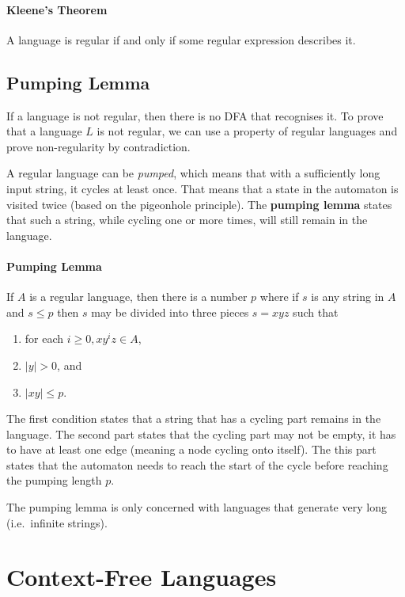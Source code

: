 \paragraph{Kleene's Theorem} A language is regular if and only if some regular expression describes it.

\subsection{Pumping Lemma}

If a language is not regular, then there is no DFA that recognises it. To prove that a language \( L \) is not regular, we can use a property of regular languages and prove non-regularity by contradiction.

A regular language can be \emph{pumped}, which means that with a sufficiently long input string, it cycles at least once. That means that a state in the automaton is visited twice (based on the pigeonhole principle). The \textbf{pumping lemma} states that such a string, while cycling one or more times, will still remain in the language.

\paragraph{Pumping Lemma} If \( A \) is a regular language, then there is a number \( p \) where if \( s \) is any string in \( A \) and \( s \leq p \) then \( s \) may be divided into three pieces \( s = xyz \) such that

\begin{enumerate}
	\item for each \( i \geq 0, xy^iz \in A \),
	\item \( |y| > 0 \), and
	\item \( |xy| \leq p \). 
\end{enumerate}

The first condition states that a string that has a cycling part remains in the language. The second part states that the cycling part may not be empty, it has to have at least one edge (meaning a node cycling onto itself). The this part states that the automaton needs to reach the start of the cycle before reaching the pumping length \(p\). 

The pumping lemma is only concerned with languages that generate very long (i.e.\ infinite strings).

\section{Context-Free Languages}

